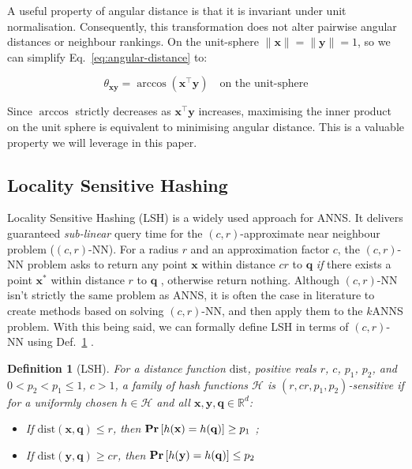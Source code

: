 \documentclass{article}
\newcommand{\Rd}{\mathbb{R}^d}
\newcommand{\bx}{\mathbf{x}}
\newcommand{\by}{\mathbf{y}}
\newcommand{\bxs}{\mathbf{x}^*}
\newcommand{\bq}{\mathbf{q}}
\newcommand{\dist}{\mathrm{dist}}
\newcommand{\mH}{\mathcal{H}}
\renewcommand{\Pr}[1]{\textrm{\bf Pr}\left[#1\right]}
\newcommand{\crNN}{$(c, r)$-NN\xspace}
\newcommand{\nbx}{\| \bx \|}
\newcommand{\nby}{\| \by \|}
\newtheorem{definition}[theorem]{Definition}
\begin{document}
A useful property of angular distance is that it is invariant under unit normalisation. Consequently, this transformation does not alter pairwise angular distances or neighbour rankings. On the unit-sphere $\nbx=\nby=1$, so we can simplify Eq.~\ref{eq:angular-distance} to:

\begin{equation}
\theta_{\bx\by} = \arccos(\bx^\top\by) \quad \text{on the unit-sphere}
\end{equation}

Since $\arccos$ strictly decreases as $\bx^\top\by$ increases, maximising the inner product on the unit sphere is equivalent to minimising angular distance. This is a valuable property we will leverage in this paper.

\subsection{Locality Sensitive Hashing}
\label{sec:lsh}

Locality Sensitive Hashing (LSH) \cite{jafari2021survey} is a widely used approach for ANNS. It delivers guaranteed \emph{sub-linear} query time for the $(c,r)$-approximate near neighbour problem (\crNN). For a radius $r$ and an approximation factor $c$, the \crNN problem asks to return any point $\bx$ within distance $cr$ to $\bq$ \emph{if} there exists a point $\bxs$ within distance $r$ to $\bq$ \cite{pham2022falconn++}, otherwise return nothing. Although \crNN isn't strictly the same problem as ANNS, it is often the case in literature to create methods based on solving \crNN, and then apply them to the $k$ANNS problem. With this being said, we can formally define LSH in terms of \crNN using Def.~\ref{def:LSH} \cite{pham2022falconn++}.

\begin{definition}[LSH]
    \label{def:LSH}
	For a distance function $\dist$, positive reals $r$, $c$, $p_1$, $p_2$, and $0 < p_2 < p_1 \leq 1$, $c > 1$, a family of hash functions $\mH$ is \emph{$(r,cr,p_1,p_2)$-sensitive} if for a uniformly chosen $h \in \mH$ and all $\bx, \by, \bq \in \Rd$:
	\begin{itemize}[leftmargin=2em]
		\item If $\dist(\bx, \bq) \leq r$, then  $\Pr{h(\bx)=h(\bq)} \geq p_1$ ;
		\item If $\dist(\by, \bq) \geq cr$, then  $\Pr{h(\by)=h(\bq)} \leq p_2$ 
	\end{itemize}
\end{definition}
\end{document}
